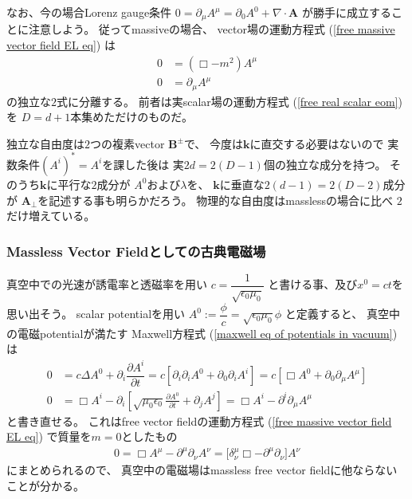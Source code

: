 \begin{enumerate}
    なお、今の場合Lorenz gauge条件
    $0 = \partial_\mu A^\mu
    = \partial_0 A^0 + \nabla \cdot \bm{A}$
    が勝手に成立することに注意しよう。
    従ってmassiveの場合、
    vector場の運動方程式
    (\ref{free massive vector field EL eq})
    は
    \begin{subequations}
    \begin{align}
        0
    &=
        (\Box - m^2) A^\mu
    \\
        0
    &=
        \partial_\mu A^\mu
    \end{align}
    \end{subequations}
    の独立な$2$式に分離する。
    前者は実scalar場の運動方程式
    (\ref{free real scalar eom})を
    $D = d + 1$本集めただけのものだ。

    独立な自由度は$2$つの複素vector $\bm{B}^\pm$で、
    今度は$\bm{k}$に直交する必要はないので
    実数条件$(A^i)^* = A^i$を課した後は
    実$2d = 2(D-1)$個の独立な成分を持つ。
    そのうち$\bm{k}$に平行な$2$成分が
    $A^0$および$\lambda$を、
    $\bm{k}$に垂直な$2(d-1) = 2(D-2)$成分が
    $\bm{A}_\perp$を記述する事も明らかだろう。
    物理的な自由度はmasslessの場合に比べ
    $2$だけ増えている。
\end{enumerate}

\subsubsection{Massless Vector Fieldとしての古典電磁場}

真空中での光速が誘電率と透磁率を用い
$c = \dfrac{1}{\sqrt{ \epsilon_0 \mu_0 }}$
と書ける事、及び$x^0 = ct$を思い出そう。
scalar potentialを用い
$A^0 := \dfrac{\phi}{c}
= \sqrt{\epsilon_0 \mu_0} \phi$
と定義すると、
真空中の電磁potentialが満たす
Maxwell方程式
(\ref{maxwell eq of potentials in vacuum})
は
\begin{subequations}
\begin{align}
  0
&=
    c \Delta A^0
  +
    \partial_i
    \dfrac{\partial A^i}
      {\partial t}
=
    c
    \left[
        \partial_i \partial_i A^0
      +
        \partial_0
        \partial_i A^i
    \right]
=
    c
    \left[
        \Box A^0
      +
        \partial_0
        \partial_\mu A^\mu
    \right]
\\
  0
&=
  \Box A^i
-
  \partial_i
  \left[
    \sqrt{ \mu_0 \epsilon_0 }
    \frac{\partial A^0}
      {\partial t}
  +
    \partial_j A^j
  \right]
=
    \Box A^i
    - \partial^i
    	\partial_\mu A^\mu
\end{align}
\end{subequations}
と書き直せる。
これはfree vector fieldの運動方程式
(\ref{free massive vector field EL eq})
で質量を$m = 0$としたもの
\begin{align}
    0 =
    \Box A^\mu
    - \partial^\mu
    \partial_\nu A^\nu
=
    \bigg[
		\delta^\mu_\nu \Box
    - \partial^\mu \partial_\nu
    \bigg] A^\nu
\end{align}
にまとめられるので、
真空中の電磁場はmassless free vector fieldに他ならないことが分かる。

